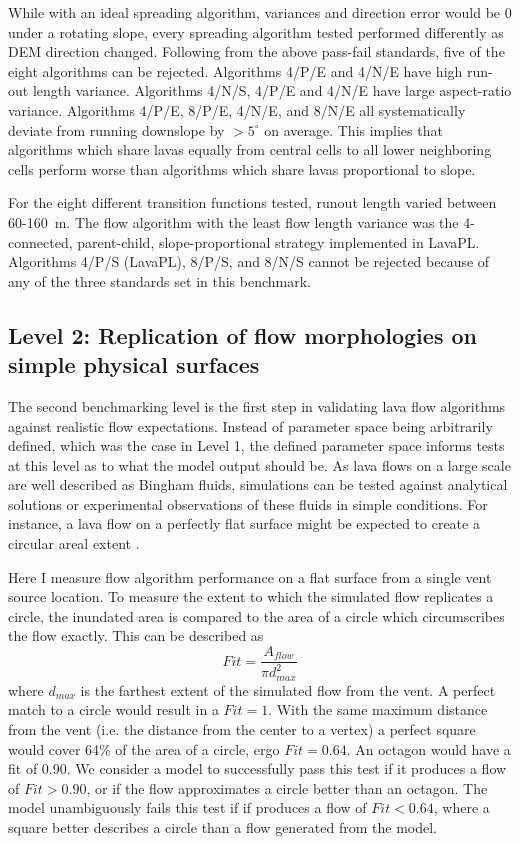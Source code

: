 			While with an ideal spreading algorithm, variances and direction error would be 0 under a rotating slope, every spreading algorithm tested performed differently as DEM direction changed. Following from the above pass-fail standards, five of the eight algorithms can be rejected. Algorithms 4/P/E and 4/N/E have high run-out length variance. Algorithms 4/N/S, 4/P/E and 4/N/E have large aspect-ratio variance. Algorithms 4/P/E, 8/P/E, 4/N/E, and 8/N/E all systematically deviate from running downslope by $>5^{\circ}$ on average. This implies that algorithms which share lavas equally from central cells to all lower neighboring cells perform worse than algorithms which share lavas proportional to slope.
			
			For the eight different transition functions tested, runout length varied between 60-160~m. The flow algorithm with the least flow length variance was the 4-connected, parent-child, slope-proportional strategy implemented in LavaPL. Algorithms 4/P/S (LavaPL), 8/P/S, and 8/N/S cannot be rejected because of any of the three standards set in this benchmark.

	\subsection{Level 2: Replication of flow morphologies on simple physical surfaces}
	
	The second benchmarking level is the first step in validating lava flow algorithms against realistic flow expectations. Instead of parameter space being arbitrarily defined, which was the case in Level 1, the defined parameter space informs tests at this level as to what the model output should be. As lava flows on a large scale are well described as Bingham fluids, simulations can be tested against analytical solutions or experimental observations of these fluids in simple conditions. For instance, a lava flow on a perfectly flat surface might be expected to create a circular areal extent \citep{griffiths2000dynamics}.
	
			Here I measure flow algorithm performance on a flat surface from a single vent source location. To measure the extent to which the simulated flow replicates a circle, the inundated area is compared to the area of a circle which circumscribes the flow exactly. This can be described as
			\begin{equation}
				Fit = \frac{A_{flow}}{\pi d_{max}^2}
			\end{equation}
			where $d_{max}$ is the farthest extent of the simulated flow from the vent. A perfect match to a circle would result in a $Fit=1$. With the same maximum distance from the vent (i.e. the distance from the center to a vertex) a perfect square would cover 64\% of the area of a circle, ergo $Fit=0.64$. An octagon would have a fit of 0.90. We consider a model to successfully pass this test if it produces a flow of $Fit>0.90$, or if the flow approximates a circle better than an octagon. The model unambiguously fails this test if if produces a flow of $Fit<0.64$, where a square better describes a circle than a flow generated from the model.

